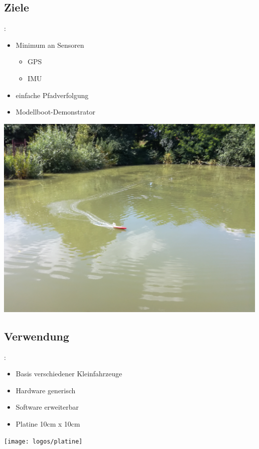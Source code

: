 \documentclass{beamer}
\begin{document}
\subsection{Ziele}
\begin{frame}{\insertsection: \insertsubsection}
\begin{minipage}{0.45\linewidth}
	\begin{itemize}
		\item Minimum an Sensoren
		\begin{itemize}
			\item GPS
			\item IMU
		\end{itemize}
		\item einfache Pfadverfolgung
		\item Modellboot-Demonstrator
	\end{itemize}
\end{minipage} \quad
\begin{minipage}{0.45\linewidth}
	\includegraphics[width=\linewidth]{rc-boat}
\end{minipage}
\end{frame}

\subsection{Verwendung}
\begin{frame}{\insertsection: \insertsubsection}
\begin{minipage}{0.45\linewidth}
	\begin{itemize}
		\item Basis verschiedener Kleinfahrzeuge
		\item Hardware generisch
		\item Software erweiterbar
		\item Platine 10cm x 10cm
	\end{itemize}
\end{minipage} \quad
\begin{minipage}{0.45\linewidth}
	\texttt{[image: logos/platine]}
\end{minipage}
\end{frame}
\end{document}
